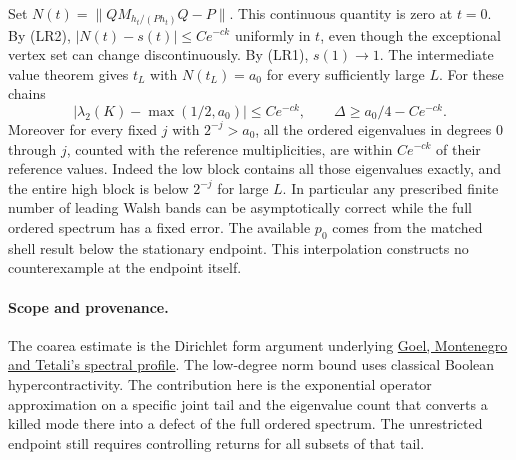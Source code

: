 Set $N(t)=\|QM_{h_t/(P h_t)}Q-P\|$. This continuous quantity is zero at
$t=0$. By (LR2), $|N(t)-s(t)|\le Ce^{-ck}$ uniformly in $t$, even though
the exceptional vertex set can change discontinuously. By (LR1),
$s(1)\to1$. The intermediate value theorem gives $t_L$ with $N(t_L)=a_0$
for every sufficiently large $L$. For these chains
\[
 |\lambda_2(K)-\max(1/2,a_0)|\le Ce^{-ck},\qquad
 \Delta\ge a_0/4-Ce^{-ck}.
\]
Moreover for every fixed $j$ with $2^{-j}>a_0$, all the ordered eigenvalues
in degrees $0$ through $j$, counted with the reference multiplicities,
are within $Ce^{-ck}$ of their reference values. Indeed the low block
contains all those eigenvalues exactly, and the entire high block is below
$2^{-j}$ for large $L$. In particular any prescribed finite number of leading
Walsh bands can be asymptotically correct while the full ordered spectrum
has a fixed error. The available $p_0$ comes from the matched shell result
below the stationary endpoint. This interpolation constructs no counterexample
at the endpoint itself.

\paragraph{Scope and provenance.}
The coarea estimate is the Dirichlet form argument underlying
\href{https://arxiv.org/abs/math/0505690}{Goel, Montenegro and Tetali's spectral profile}.
The low-degree norm bound uses classical Boolean hypercontractivity.
The contribution here is the exponential operator approximation on a
specific joint tail and the eigenvalue count that converts a killed mode
there into a defect of the full ordered spectrum. The unrestricted
endpoint still requires controlling returns for all subsets of that tail.
